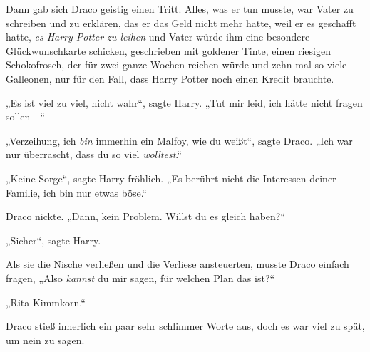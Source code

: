 Dann gab sich Draco geistig einen Tritt. Alles, was er tun musste, war Vater zu schreiben und zu erklären, das er das Geld nicht mehr hatte, weil er es geschafft hatte, \emph{es Harry Potter zu leihen} und Vater würde ihm eine besondere Glückwunschkarte schicken, geschrieben mit goldener Tinte, einen riesigen Schokofrosch, der für zwei ganze Wochen reichen würde und zehn mal so viele Galleonen, nur für den Fall, dass Harry Potter noch einen Kredit brauchte.

„Es ist viel zu viel, nicht wahr“, sagte Harry. „Tut mir leid, ich hätte nicht fragen sollen—“

„Verzeihung, ich \emph{bin} immerhin ein Malfoy, wie du weißt“, sagte Draco. „Ich war nur überrascht, dass du so viel \emph{wolltest}.“

„Keine Sorge“, sagte Harry fröhlich. „Es berührt nicht die Interessen deiner Familie, ich bin nur etwas böse.“

Draco nickte. „Dann, kein Problem. Willst du es gleich haben?“

„Sicher“, sagte Harry.

Als sie die Nische verließen und die Verliese ansteuerten, musste Draco einfach fragen, „Also \emph{kannst} du mir sagen, für welchen Plan das ist?“

„Rita Kimmkorn.“

Draco stieß innerlich ein paar sehr schlimmer Worte aus, doch es war viel zu spät, um nein zu sagen.

\later


